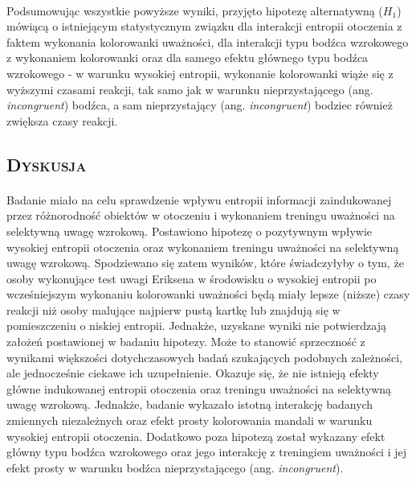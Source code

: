 \documentclass[12pt,a4paper,final,oneside,onecolumn,titlepage]{article}
\begin{document}
\paragraph{}
Podsumowując wszystkie powyższe wyniki, przyjęto hipotezę alternatywną ($H_1$) mówiącą o istniejącym statystycznym związku dla interakcji entropii otoczenia z faktem wykonania kolorowanki uważności, dla interakcji typu bodźca wzrokowego z wykonaniem kolorowanki oraz dla samego efektu głównego typu bodźca wzrokowego - w warunku wysokiej entropii, wykonanie kolorowanki wiąże się z wyższymi czasami reakcji, tak samo jak w warunku nieprzystającego (ang. \textit{incongruent}) bodźca, a sam nieprzystający (ang. \textit{incongruent}) bodziec również zwiększa czasy reakcji.
\begin{center}
\section*{\large{\textbf{\textsc{Dyskusja}}}}
\end{center}
\paragraph{}
Badanie miało na celu sprawdzenie wpływu entropii informacji zaindukowanej przez różnorodność obiektów w otoczeniu i wykonaniem treningu uważności na selektywną uwagę wzrokową. Postawiono hipotezę o pozytywnym wpływie wysokiej entropii otoczenia oraz wykonaniem treningu uważności na selektywną uwagę wzrokową. Spodziewano się zatem wyników, które świadczyłyby o tym, że osoby wykonujące test uwagi Eriksena w środowisku o wysokiej entropii po wcześniejszym wykonaniu kolorowanki uważności będą miały lepsze (niższe) czasy reakcji niż osoby malujące najpierw pustą kartkę lub znajdują się w pomieszczeniu o niskiej entropii. Jednakże, uzyskane wyniki nie potwierdzają założeń postawionej w badaniu hipotezy. Może to stanowić sprzeczność z wynikami większości dotychczasowych badań szukających podobnych zależności, ale jednocześnie ciekawe ich uzupełnienie. Okazuje się, że nie istnieją efekty główne indukowanej entropii otoczenia oraz treningu uważności na selektywną uwagę wzrokową. Jednakże, badanie wykazało istotną interakcję badanych zmiennych niezależnych oraz efekt prosty kolorowania mandali w warunku wysokiej entropii otoczenia. Dodatkowo poza hipotezą został wykazany efekt główny typu bodźca wzrokowego oraz jego interakcję z treningiem uważności i jej efekt prosty w warunku bodźca nieprzystającego (ang. \textit{incongruent}).
\end{document}
